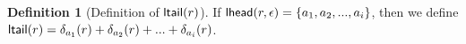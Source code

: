 \documentclass[11pt,leqno]{article}
\newtheorem{trthm}[tr]{Theorem}
\theoremstyle{definition}
\newtheorem{defn}[thm]{Definition}
\newcommand{\Lagr}{\mathcal{L}}
\newcommand{\lang}[1]{\Lagr\{#1\}}
\newcommand{\lambdas}{\lambda_{RS}}
\newcommand{\lhead}[1]{ {\sf lhead}(#1) }
\newcommand{\ltail}[1]{ {\sf ltail}(#1) }
\begin{document}
\begin{defn}[Definition of $\ltail{r}$]
If $\lhead{r, \epsilon} = \{a_1, a_2, ..., a_i\}$, then  
we define $\ltail{r} = \delta_{a_1}(r) + \delta_{a_2}(r) + ... + \delta_{a_i}(r)$.
\end{defn}









\end{document}
